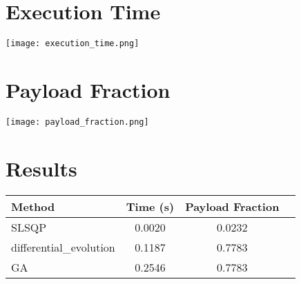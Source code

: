 \documentclass{article}
\begin{document}
\section{Execution Time}
\texttt{[image: execution\_time.png]}

\section{Payload Fraction}
\texttt{[image: payload\_fraction.png]}

\section{Results}
\begin{tabular}{lccc}
\hline
Method & Time (s) & Payload Fraction \\
\hline
SLSQP & 0.0020 & 0.0232 \\
differential_evolution & 0.1187 & 0.7783 \\
GA & 0.2546 & 0.7783 \\

\hline
\end{tabular}
\end{document}
